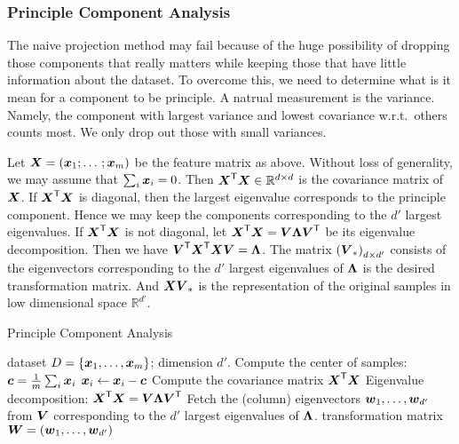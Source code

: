\subsubsection{Principle Component Analysis}
The naive projection method may fail because of the huge possibility of dropping those components that really
matters while keeping those that have little information about the dataset. To overcome this, we need to
determine what is it mean for a component to be principle. A natrual measurement is the variance. Namely, 
the component with largest variance and lowest covariance w.r.t.\ others counts most. We only drop out those 
with small variances. 
\par
Let $\boldsymbol{X} = {\left(\boldsymbol{x}_1; \dotsc; \boldsymbol{x}_m\right)}$ be the feature matrix as above. Without loss of 
generality, we may assume that $\sum_i \boldsymbol{x}_i = 0$. Then ${\boldsymbol{X}}^\mathsf{T}\boldsymbol{X} \in \mathbb{R}^{d \times d}$ is the
covariance matrix of $\boldsymbol{X}$. If ${\boldsymbol{X}}^\mathsf{T}\boldsymbol{X}$ is diagonal, then the largest eigenvalue corresponds to the 
principle component. Hence we may keep the components corresponding to the $d'$ largest eigenvalues. If 
${\boldsymbol{X}}^\mathsf{T}\boldsymbol{X}$ is not diagonal, let ${\boldsymbol{X}}^\mathsf{T}\boldsymbol{X} = \boldsymbol{V}\boldsymbol{\Lambda}{\boldsymbol{V}}^\mathsf{T}$ be its eigenvalue 
decomposition. Then we have ${\boldsymbol{V}}^\mathsf{T}{\boldsymbol{X}}^\mathsf{T}\boldsymbol{X}\boldsymbol{V} = \boldsymbol{\Lambda}$. The matrix 
${\left(\boldsymbol{V}_*\right)}_{d \times d'}$ consists of the eigenvectors corresponding to the $d'$ largest 
eigenvalues of $\boldsymbol{\Lambda}$ is the desired transformation matrix. And $\boldsymbol{X}\boldsymbol{V}_*$ is the representation of
the original samples in low dimensional space $\mathbb{R}^{d'}$.

\begin{algorithm}
    \caption{Principle Component Analysis}\label{algorithm:pca}
    \begin{algorithmic}[1]
        \Require dataset $D = \left\{\boldsymbol{x}_1, \dotsc, \boldsymbol{x}_m\right\}$; dimension $d'$.
        \State Compute the center of samples: $\boldsymbol{c} = \frac{1}{m}\sum_i \boldsymbol{x}_i$
        \State $\boldsymbol{x}_i \gets \boldsymbol{x}_i -\boldsymbol{c}$
        \State Compute the covariance matrix ${\boldsymbol{X}}^\mathsf{T}\boldsymbol{X}$
        \State Eigenvalue decomposition: ${\boldsymbol{X}}^\mathsf{T}\boldsymbol{X} = \boldsymbol{V}\boldsymbol{\Lambda}{\boldsymbol{V}}^\mathsf{T}$
        \State Fetch the (column) eigenvectors $\boldsymbol{w}_1, \dotsc, \boldsymbol{w}_{d'}$ from $\boldsymbol{V}$ corresponding to the
        $d'$ largest eigenvalues of $\boldsymbol{\Lambda}$.
        \Ensure transformation matrix $\boldsymbol{W} = \left(\boldsymbol{w}_1, \dotsc, \boldsymbol{w}_{d'}\right)$
    \end{algorithmic}
\end{algorithm}

